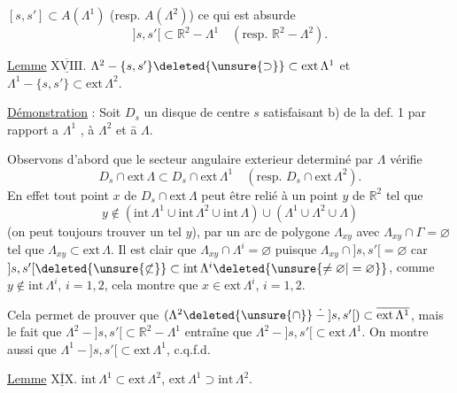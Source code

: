 $[s,s']\subset A(\Lambda^{1})$ (resp. $A(\Lambda^{2})$) ce qui est absurde 
\[
{]s,s'[}\subset\mathbb{R}^{2}-\Lambda^{1}\quad(\text{resp. }\mathbb{R}^{2}-\Lambda^{2}).
\]

\uline{Lemme} $\underline{\overline{\mathrm{XVIII}}}$. $\Lambda^{2}-\{s,s'\}\deleted{\unsure{\supset}}\subset\mathrm{ext}\,\Lambda^{1}$ et $\Lambda^{1}-\{s,s'\}\subset\mathrm{ext}\,\Lambda^{2}$.

\uline{Démonstration} : Soit $D_s$ un disque de centre $s$ satisfaisant b) de la def. 1 par rapport a $\Lambda^{1}$ , à $\Lambda^{2}$ et \={a} $\Lambda$.

Observons d'abord que le secteur angulaire exterieur  determiné par $\Lambda$ vérifie
\[
D_s\cap\mathrm{ext}\,\Lambda\subset D_s\cap\mathrm{ext}\,\Lambda^{1}\quad(\text{resp. }D_s\cap\mathrm{ext}\,\Lambda^{2}).
\]
En effet tout point $x$ de $D_s\cap\mathrm{ext}\,\Lambda$ peut être relié à un point $y$ de $\mathbb{R}^{2}$ tel que
\[
y\notin(\mathrm{int}\,\Lambda^{1}\cup\mathrm{int}\,\Lambda^{2}\cup\mathrm{int}\,\Lambda)\cup(\Lambda^{1}\cup\Lambda^{2}\cup\Lambda)
\]
 (on peut toujours trouver un tel $y$), par un arc de polygone $\Lambda_{xy}$ avec $\Lambda_{xy}\cap\Gamma=\varnothing$  tel que $\Lambda_{xy}\subset\mathrm{ext}\,\Lambda$. Il est clair que $\Lambda_{xy}\cap\Lambda^{i}=\varnothing$ puisque $\Lambda_{xy}\cap{]s,s'[}=\varnothing$ car $ {]s,s'[}\deleted{\unsure{\not\subset}}\subset\mathrm{int}\,\Lambda^{i}\deleted{\unsure{\ne\varnothing|=\varnothing}}$, comme $y\notin\mathrm{int}\,\Lambda^{i}$, $i=1,2$, cela montre que $x\in\mathrm{ext}\,\Lambda^{i}$, $i=1,2$.

Cela permet de prouver que $(\Lambda^{2}\deleted{\unsure{\cap}}\mathbin{\dot{-}}{]s,s'[})\subset\overline{\mathrm{ext}\,\Lambda^{1}}$, mais le fait que $\Lambda^{2}-{]s,s'[}\subset\mathbb{R}^{2}-\Lambda^{1}$ entraîne que $\Lambda^{2}-{]s,s'[}\subset\mathrm{ext}\,\Lambda^{1}$. On montre aussi  que $\Lambda^{1}-{]s,s'[}\subset\mathrm{ext}\,\Lambda^{1}$, c.q.f.d.

\uline{Lemme} $\underline{\overline{\mathrm{XIX}}}$. $\mathrm{int}\,\Lambda^{1}\subset\mathrm{ext}\,\Lambda^{2}$, $\mathrm{ext}\,\Lambda^{1}\supset\mathrm{int}\,\Lambda^{2}$.

